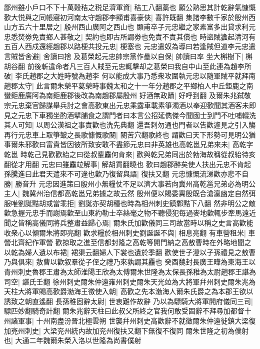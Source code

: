 鄙州雖小戶口不下十萬穀秸之税足濟軍資|{
	秸工八翻藁也}
願公熟思其計乾辭氣慷慨歡大悦與之同帳寢初河南太守趙郡李顯甫喜豪俠|{
	喜許既翻}
集諸李數千家於殷州西山方五六十里居之|{
	殷州西山廣阿之西山也}
顯甫卒子元忠繼之家素富多出貸求利元忠悉焚劵免責鄉人甚敬之|{
	契約也即古所謂劵也免責不責其償也}
時盜賊蠭起清河有五百人西戍還經趙郡以路梗共投元忠|{
	梗塞也}
元忠遣奴為導曰若逢賊但道李元忠遣　言賊皆舍避|{
	舍讀曰捨}
及葛榮起元忠帥宗黨作壘以自保|{
	帥讀曰率}
坐大槲樹下|{
	槲胡谷翻}
前後斬違命者凡三百人賊至元忠輒擊却之葛榮曰我自中山至此連為趙李所破|{
	李氏趙郡之大姓時號為趙李}
何以能成大事乃悉衆攻圍執元忠以隨軍賊平就拜南趙郡太守|{
	此言爾朱榮平葛榮時事魏太和之十一年分趙郡之平鄉柏人中丘鉅鹿之南蠻鉅鹿廣阿為南鉅鹿郡後改為南趙郡屬殷州}
好酒無政蹟|{
	好呼到翻}
及爾朱兆弑敬宗元忠棄官歸謀舉兵討之會高歡東出元忠乘露車載素箏濁酒以奉迎歡聞其酒客未即見之元忠下車獨坐酌酒擘脯食之謂門者曰本言公招延儁傑今聞國士到門不吐哺輟洗其人可知|{
	以周公漢祖之事責歡也洗先典翻}
還吾刺勿通也門者以告歡遽見之引入觴再行元忠車上取箏皷之長歌慷慨歌闋|{
	闋苦穴翻歌終也}
謂歡曰天下形勢可見明公猶事爾朱邪歡曰富貴皆因彼所致安敢不盡節元忠曰非英雄也高乾邕兄弟來未|{
	高乾字乾邕}
時乾己見歡歡紿之曰從叔輩麤何肯來|{
	歡與乾兄弟同出於勃海故稱從叔紿待亥翻從才用翻}
元忠曰雖麤竝解事|{
	解胡買翻曉也}
歡曰趙郡醉矣使人扶出元忠不肯起孫騰進曰此君天遣來不可違也歡乃復留與語|{
	復扶又翻}
元忠慷慨流涕歡亦悲不自勝|{
	勝音升}
元忠因進策曰殷州小無糧仗不足以濟大事若向冀州高乾邕兄弟必為明公主人|{
	魏冀州治信都高乾邕兄弟據之故云然}
殷州便以賜委冀殷既合滄瀛幽定自然弭服唯劉誕黠胡或當乖拒|{
	劉誕亦契胡種也時為相州刺史鎮鄴黠下八翻}
然非明公之敵歡急握元忠手而謝焉歡至山東約勒士卒絲毫之物不聽侵犯每過麥地歡輒步牽馬遠近聞之皆稱高儀同將兵整肅益歸心焉|{
	爾朱氏加歡儀同三司故當時以稱之史言高歡能收衆心以傾爾朱將即亮翻}
歡求糧於相州刺史劉誕誕不與|{
	相息亮翻}
有車營租米|{
	車營北齊紀作軍營}
歡掠取之進至信都封隆之高乾等開門納之高敖曹時在外略地聞之以乾為婦人遺以布裙|{
	裙渠云翻婦人下裳也遺於季翻}
歡使世子澄以子孫禮見之敖曹乃與俱來|{
	敖曹以歡叙羣從子侄之禮乃來孰謂其麤也}
癸酉魏封長廣王曄為東海王以青州刺史魯郡王肅為太師淮陽王欣為太傅爾朱世隆為太保長孫稚為太尉趙郡王諶為司空|{
	諶氏壬翻}
徐州刺史爾朱仲遠雍州刺史爾朱天光竝為大將軍幷州刺史爾朱兆為天柱大將軍賜高歡爵渤海王徵使入朝|{
	高歡之先本渤海人爾朱氏爵之為本郡王欲以誘致之朝直遙翻}
長孫稚固辭太尉|{
	世衷難作故辭}
乃以為驃騎大將軍開府儀同三司|{
	驃匹妙翻騎奇計翻}
爾朱兆辭天柱曰此叔父所終之官我何敢受固辭不拜尋加都督十州諸軍事|{
	十州南盡汾晉北極雲朔}
世襲幷州刺史高歡辭不就徵爾朱仲遠徙鎮大梁復加兗州刺史|{
	大梁兖州統内故加兖州復扶又翻下無復不復同}
爾朱世隆之初為僕射也|{
	大通二年魏爾朱榮入洛以世隆為尚書僕射}
